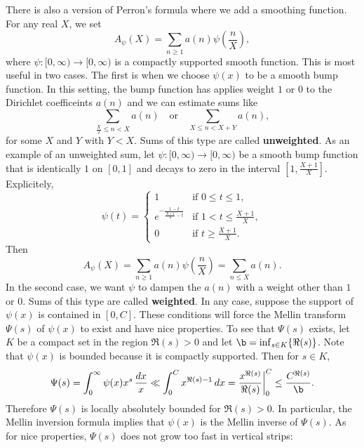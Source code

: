       There is also a version of Perron's formula where we add a smoothing function. For any real $X$, we set
      \[
        A_{\psi}(X) = \sum_{n \ge 1}a(n)\psi\left(\frac{n}{X}\right),
      \]
      where $\psi:[0,\infty) \to [0,\infty)$ is a compactly supported smooth function. This is most useful in two cases. The first is when we choose $\psi(x)$ to be a smooth bump function. In this setting, the bump function has applies weight $1$ or $0$ to the Dirichlet coefficeints $a(n)$ and we can estimate sums like
      \[
        \sum_{\frac{X}{2} \le n < X}a(n) \quad \text{or} \quad \sum_{X \le n < X+Y}a(n),
      \]
      for some $X$ and $Y$ with $Y < X$. Sums of this type are called \textbf{unweighted}. As an example of an unweighted sum, let $\psi:[0,\infty) \to [0,\infty)$ be a smooth bump function that is identically $1$ on $[0,1]$ and decays to zero in the interval $\left[1,\frac{X+1}{X}\right]$. Explicitely,
      \[
        \psi(t) = \begin{cases} 1 & \text{if $0 \le t \le 1$}, \\ e^{-\frac{1-t}{\frac{X+1}{X}-t}} & \text{if $1 < t \le \frac{X+1}{X}$}, \\ 0 & \text{if $t \ge \frac{X+1}{X}$}. \end{cases}
      \]
      Then 
      \[
        A_{\psi}(X) = \sum_{n \ge 1}a(n)\psi\left(\frac{n}{X}\right) = \sum_{n \le X}a(n).
      \]
      In the second case, we want $\psi$ to dampen the $a(n)$ with a weight other than $1$ or $0$. Sums of this type are called \textbf{weighted}. In any case, suppose the support of $\psi(x)$ is contained in $[0,C]$. These conditions will force the Mellin transform $\Psi(s)$ of $\psi(x)$ to exist and have nice properties. To see that $\Psi(s)$ exists, let $K$ be a compact set in the region $\Re(s) > 0$ and let $\b = \inf_{s \in K}\{\Re(s)\}$. Note that $\psi(x)$ is bounded because it is compactly supported. Then for $s \in K$,
      \[
        \Psi(s) = \int_{0}^{\infty}\psi(x)x^{s}\,\frac{dx}{x} \ll \int_{0}^{C}x^{\Re(s)-1}\,dx = \frac{x^{\Re(s)}}{\Re(s)}\bigg|_{0}^{C} \le \frac{C^{\Re(s)}}{\b}.
      \]
      Therefore $\Psi(s)$ is locally absolutely bounded for $\Re(s) > 0$. In particular, the Mellin inversion formula implies that $\psi(x)$ is the Mellin inverse of $\Psi(s)$. As for nice properties, $\Psi(s)$ does not grow too fast in vertical strips:

